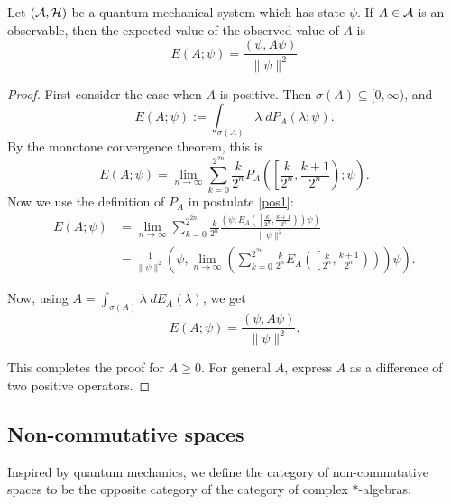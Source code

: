 \begin{theorem}
    Let $(\mathcal{A},\mathcal{H})$ be a quantum mechanical system
    which has state $\psi$. If $A \in \mathcal{A}$
    is an observable, then the expected value of the observed
    value of $A$ is 
    \begin{equation*}
        E(A;\psi) = \frac{(\psi,A\psi)}{\|\psi\|^2}
    \end{equation*}
\end{theorem}
\begin{proof}
    First consider the case when $A$ is positive. Then $\sigma(A) \subseteq [0,\infty)$,
    and 
    \begin{equation*}
        E(A;\psi) := \int_{\sigma(A)} \lambda\;dP_A(\lambda;\psi).
    \end{equation*}
    By the monotone convergence theorem, this is
    \begin{equation*}
        E(A;\psi) = \lim_{n\rightarrow\infty} \sum_{k=0}^{2^{2n}} \frac{k}{2^n}P_A\left(\left[\frac{k}{2^n},\frac{k+1}{2^n}\right);\psi\right).
    \end{equation*}
    Now we use the definition of $P_A$ in postulate \ref{pos1}:
    \begin{align*}
        E(A;\psi) &= \lim_{n\rightarrow\infty} \sum_{k=0}^{2^{2n}} \frac{k}{2^n}\frac{\left(\psi,E_A\left(\left[\frac{k}{2^n},\frac{k+1}{2^n}\right)\right)\psi\right)}{\|\psi\|^2}\\
        &= \frac{1}{\|\psi\|^2}\left(\psi,\lim_{n\rightarrow\infty} \left(\sum_{k=0}^{2^{2n}} \frac{k}{2^n}E_A\left(\left[\frac{k}{2^n},\frac{k+1}{2^n}\right)\right)\right)\psi\right).
    \end{align*}
    
    Now, using $A = \int_{\sigma(A)} \lambda\;dE_A(\lambda)$, we get
    \begin{equation*}
        E(A;\psi) = \frac{(\psi,A\psi)}{\|\psi\|^2}.
    \end{equation*}
    
    This completes the proof for $A \geq 0$. For general $A$,
    express $A$ as a difference of two positive operators.
\end{proof}

\subsection{Non-commutative spaces}
Inspired by quantum mechanics, we define the category of non-commutative spaces
to be the opposite category of the category of complex $*$-algebras.

